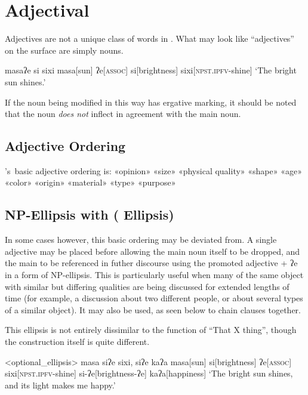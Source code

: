 \chapter{Adjectival}\label{ch:adjectives}
Adjectives are not a unique class of words in \langname . What may look like ``adjectives'' on the surface are simply nouns.

\ex
\begingl
\glpreamble masaʔe si sixi
\endpreamble
\nogloss{\lbrack}
masa[sun]
ʔe[\textsc{assoc}]
si[brightness]
\nogloss{\rbrack}
sixi[\textsc{npst.ipfv}-shine]
\glft `The bright sun shines.'
\endgl
\xe

If the noun being modified in this way has ergative marking, it should be noted that the noun \textit{does not} inflect in agreement with the main noun.

\section{Adjective Ordering}

\langname 's\ basic adjective ordering is: «opinion» «size» «physical quality» «shape» «age» «color» «origin» «material» «type» «purpose»

\section[\langword{ʔe} Ellipsis]{NP-Ellipsis with  ( Ellipsis)}

In some cases however, this basic ordering may be deviated from. A single adjective may be placed before  allowing the main noun itself to be dropped, and the main to be referenced in futher discourse using the promoted adjective + ʔe in a form of NP-ellipsis. This is particularly useful when many of the same object with similar but differing qualities are being discussed for extended lengths of time (for example, a discussion about two different people, or about several types of a similar object). It may also be used, as seen below to chain clauses together.

This ellipsis is not entirely dissimilar to the function of ``That X thing'', though the construction itself is quite different.


\ex<optional_ellipsis>
\begingl
\glpreamble masa siʔe sixi, siʔe kaʔa
\endpreamble
\nogloss{\lbrack}
masa[sun]
si[brightness]
ʔe[\textsc{assoc}]
\nogloss{\rbrack}
sixi[\textsc{npst.ipfv}-shine]
si-ʔe[brightness-ʔe]
kaʔa[happiness]
\glft `The bright sun shines, and its light makes me happy.'
\endgl
\xe

